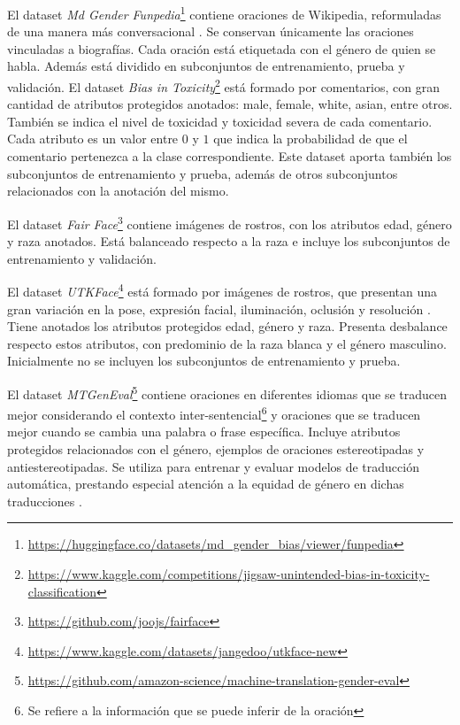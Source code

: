     El dataset \textit{Md Gender Funpedia}\footnote{\url{https://huggingface.co/datasets/md_gender_bias/viewer/funpedia}} contiene oraciones de 
    Wikipedia, reformuladas de una manera m\'as conversacional \parencite{dinan2020multidimensional}. Se conservan \'unicamente las oraciones 
    vinculadas a biograf\'ias. Cada oraci\'on est\'a etiquetada con el g\'enero de quien se habla. Adem\'as est\'a dividido en subconjuntos de 
    entrenamiento, prueba y validaci\'on.
    El dataset \textit{Bias in Toxicity}\footnote{\url{https://www.kaggle.com/competitions/jigsaw-unintended-bias-in-toxicity-classification}}
    est\'a formado por comentarios, con gran cantidad de atributos protegidos anotados: male, female, white, asian, entre otros. Tambi\'en se 
    indica el nivel de toxicidad y toxicidad severa de cada comentario. Cada atributo es un valor entre $0$ y $1$ que indica la probabilidad de 
    que el comentario pertenezca a la clase correspondiente. Este dataset aporta tambi\'en los subconjuntos de entrenamiento y prueba, adem\'as 
    de otros subconjuntos relacionados con la anotaci\'on del mismo.  

    El dataset \textit{Fair Face}\footnote{\url{https://github.com/joojs/fairface}} contiene im\'agenes de rostros, con los atributos edad, 
    g\'enero y raza anotados. Est\'a balanceado respecto a la raza \parencite{karkkainenfairface} e incluye los subconjuntos de entrenamiento y 
    validaci\'on.

    El dataset \textit{UTKFace}\footnote{\url{https://www.kaggle.com/datasets/jangedoo/utkface-new}} est\'a formado por im\'agenes de rostros, que 
    presentan una gran variaci\'on en la pose, expresi\'on facial, iluminaci\'on, oclusi\'on y resoluci\'on \parencite{zhang2017age}. 
    Tiene anotados los atributos protegidos edad, g\'enero y raza. Presenta desbalance respecto estos atributos, con predominio de la raza 
    blanca y el g\'enero masculino. Inicialmente no se incluyen los subconjuntos de entrenamiento y prueba.

    El dataset \textit{MTGenEval}\footnote{\url{https://github.com/amazon-science/machine-translation-gender-eval}} contiene oraciones en 
    diferentes idiomas que se traducen mejor considerando el contexto inter-sentencial\footnote{Se refiere a la informaci\'on que se puede 
    inferir de la oraci\'on} y oraciones que se traducen mejor cuando se cambia una palabra o frase espec\'ifica. Incluye atributos protegidos 
    relacionados con el g\'enero, ejemplos de oraciones estereotipadas y antiestereotipadas. Se utiliza para entrenar y evaluar modelos de 
    traducci\'on autom\'atica, prestando especial atenci\'on a la equidad de g\'enero en dichas traducciones \parencite{Currey2022}.

